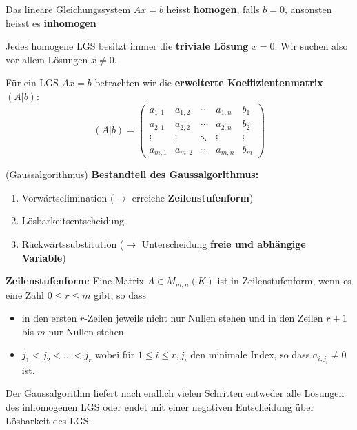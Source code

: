 \documentclass[../Algebra_script.tex]{subfiles}
\begin{document}
\begin{definition}
	Das lineare Gleichungssystem $Ax = b$ heisst \textbf{homogen}, falls $b = 0$, ansonsten heisst es \textbf{inhomogen}
\end{definition}

\begin{remark}
	Jedes homogene LGS besitzt immer die \textbf{triviale Lösung} $x = 0$. Wir suchen also vor allem Lösungen $x \neq 0$.
	
	Für ein LGS $Ax = b$ betrachten wir die \textbf{erweiterte Koeffizientenmatrix} $(A | b)$:
	\[(A | b) = 
		\left(\begin{array}{cccc|c}
			a_{1,1} & a_{1,2} & \cdots & a_{1,n} &b_1\\
			a_{2,1} & a_{2,2} & \cdots & a_{2,n} &b_2\\
			\vdots  & \vdots  & \ddots & \vdots  &\vdots\\
			a_{m,1} & a_{m,2} & \cdots & a_{m,n} &b_m
 		\end{array}\right)
 	\]
\end{remark}

\begin{definition}{(Gaussalgorithmus)}
	\textbf{Bestandteil des Gaussalgorithmus:}
	\begin{enumerate}
		\item Vorwärtselimination ($\to$ erreiche \textbf{Zeilenstufenform})
		\item Lösbarkeitsentscheidung
		\item Rückwärtssubstitution ($\to$ Unterscheidung \textbf{freie und abhängige Variable})
	\end{enumerate}
	\textbf{Zeilenstufenform}: Eine Matrix $A \in M_{m, n}(K)$ ist in Zeilenstufenform, wenn es eine Zahl $0 \leq r \leq m$ gibt, so dass
	\begin{itemize}
		\item in den ersten $r$-Zeilen jeweils nicht nur Nullen stehen und in den Zeilen $r+1$ bis $m$ nur Nullen stehen
		\item $j_1 < j_2 < \ldots < j_r$ wobei für $1 \leq i \leq r, j_i$ den minimale Index, so dass $a_{i,j_i} \neq 0$ ist.
	\end{itemize}
\end{definition}

\begin{proposition}
	Der Gaussalgorithm liefert nach endlich vielen Schritten entweder alle Lösungen des inhomogenen LGS oder endet mit einer negativen Entscheidung über Lösbarkeit des LGS.
\end{proposition}
\end{document}
